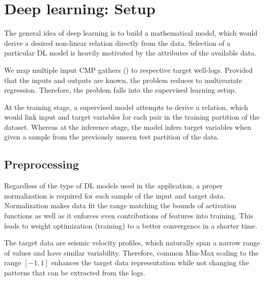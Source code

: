 \documentclass[manuscript]{geophysics}
\begin{document}

\section{Deep learning: Setup}
The general idea of deep learning is to build a mathematical model, which would derive a desired non-linear relation directly from the data. Selection of a particular DL model is heavily motivated by the attributes of the available data. 

We map multiple input CMP gathers () to respective target well-logs. Provided that the inputs and outputs are known, the problem reduces to multivariate regression. Therefore, the problem falls into the supervised learning setup.  

At the training stage, a supervised model attempts to derive a relation, which would link input and target variables for each pair in the training partition of the dataset. Whereas at the inference stage, the model infers target variables when given a sample from the previously unseen test partition of the data.

\subsection{Preprocessing}
Regardless of the type of DL models used in the application, a proper normalization is required for each sample of the input and target data. Normalization makes data fit the range matching the bounds of activation functions as well as it enforces even contributions of features into training. This leads to weight optimization (training) to a better convergence in a shorter time.


The target data are seismic velocity profiles, which naturally span a narrow range of values and have similar variability. Therefore, common Min-Max scaling to the range $[-1, 1]$ enhances the target data representation while not changing the patterns that can be extracted from the logs.  
\end{document}
